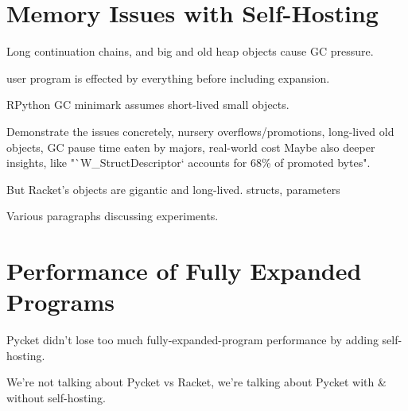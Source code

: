	\section{Memory Issues with Self-Hosting}
	\label{section:memory}

		\begin{mainpoint}
			Long continuation chains, and big and old heap objects cause GC pressure.
		\end{mainpoint}

		\begin{paragraph-here}
			user program is effected by everything before including expansion.
		\end{paragraph-here}

		\begin{paragraph-here}
			RPython GC minimark assumes short-lived small objects.
		\end{paragraph-here}

		\begin{show-experiment}
				Demonstrate the issues concretely, nursery overflows/promotions, long-lived old objects, GC pause time eaten by majors, real-world cost
				Maybe also deeper insights, like "`W\_StructDescriptor` accounts for 68\% of promoted bytes".
		\end{show-experiment}

		\begin{paragraph-here}
			But Racket's objects are gigantic and long-lived.	structs, parameters
		\end{paragraph-here}

		\begin{paragraph-here}
			Various paragraphs discussing experiments.
		\end{paragraph-here}

	\section{Performance of Fully Expanded Programs}
	\label{section:cross-benchmarks}

		\begin{mainpoint}
				Pycket didn't lose too much fully-expanded-program performance by adding self-hosting.
		\end{mainpoint}

		\begin{paragraph-here}
			We're not talking about Pycket vs Racket, we're talking about Pycket with \& without self-hosting.
		\end{paragraph-here}

